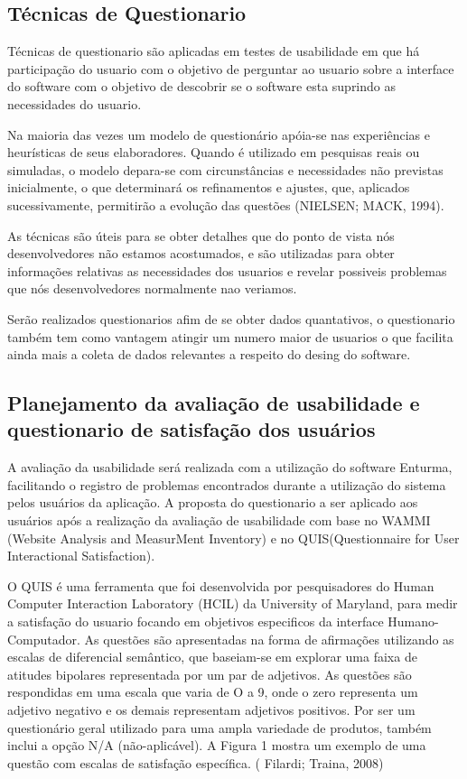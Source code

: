\subsection{Técnicas de Questionario}
	Técnicas de questionario são aplicadas em testes de usabilidade em que há participação do usuario com o objetivo de perguntar ao usuario sobre a interface do software com o objetivo de descobrir se o software esta suprindo as necessidades do usuario.

	Na maioria das vezes um modelo de questionário apóia-se nas experiências e
	heurísticas de seus elaboradores. Quando é utilizado em pesquisas reais ou simuladas, o
	modelo depara-se com circunstâncias e necessidades não previstas inicialmente, o que
	determinará os refinamentos e ajustes, que, aplicados sucessivamente, permitirão a
	evolução das questões (NIELSEN; MACK, 1994). 
	
	As técnicas são úteis para se obter detalhes que do ponto de vista nós desenvolvedores não estamos acostumados, e são utilizadas para obter informações relativas as necessidades dos usuarios e revelar possiveis problemas que nós desenvolvedores normalmente nao veriamos.
	
	Serão realizados questionarios afim de se obter dados quantativos, o questionario também tem como vantagem atingir um numero maior de usuarios o que facilita ainda mais a coleta de dados relevantes a respeito do desing do software.
	
	


\subsection{Planejamento da avaliação de usabilidade e questionario de satisfação dos usuários}

	A avaliação da usabilidade será realizada com a utilização do software Enturma, facilitando o registro de problemas encontrados durante a utilização do sistema pelos usuários da aplicação.
	A proposta do questionario a ser aplicado aos usuários após a realização da avaliação de usabilidade com base no WAMMI (Website Analysis and MeasurMent Inventory) e no QUIS(Questionnaire for User Interactional Satisfaction).


	O QUIS é uma ferramenta que foi desenvolvida por pesquisadores do Human Computer Interaction Laboratory (HCIL) da University of Maryland, para medir a satisfação do usuario focando em objetivos especificos da interface Humano-Computador.
	As questões são apresentadas na forma de afirmações
utilizando as escalas de diferencial semântico, que
baseiam-se em explorar uma faixa de atitudes bipolares
representada por um par de adjetivos. As questões são
respondidas em uma escala que varia de O a 9, onde o zero
representa um adjetivo negativo e os demais representam
adjetivos positivos. Por ser um questionário geral utilizado
para uma ampla variedade de produtos, também inclui a
opção N/A (não-aplicável). A Figura 1 mostra um exemplo
de uma questão com escalas de satisfação específica. ( Filardi; Traina, 2008)

